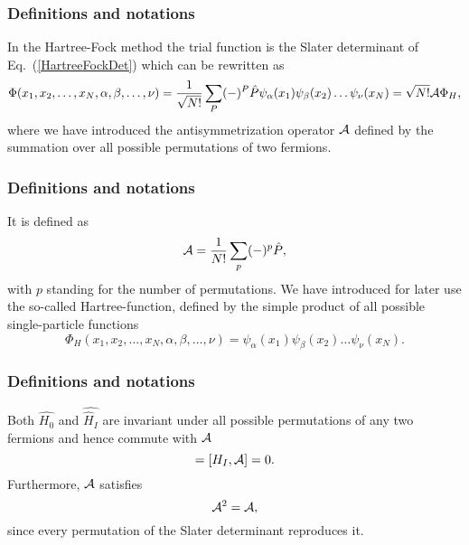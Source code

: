 \documentclass[compress]{beamer}
\begin{document}
\frame
{
  \frametitle{Definitions and notations}
\begin{small}
{\scriptsize
In the Hartree-Fock method the trial function is the Slater
determinant of Eq.~(\ref{HartreeFockDet}) which can be rewritten as 
\begin{equation}
  \Phi(x_1,x_2,\dots,x_N,\alpha,\beta,\dots,\nu) = \frac{1}{\sqrt{N!}}\sum_{P} (-)^P\hat{P}\psi_{\alpha}(x_1)
    \psi_{\beta}(x_2)\dots\psi_{\nu}(x_N)=\sqrt{N!}{\cal A}\Phi_H,
\label{HartreeFockPermutation}
\end{equation}
where we have introduced the antisymmetrization operator ${\cal A}$ defined by the 
summation over all possible permutations of two fermions.
}
\end{small}
}

\frame
{
  \frametitle{Definitions and notations}
\begin{small}
{\scriptsize
It is defined as
\begin{equation}
  {\cal A} = \frac{1}{N!}\sum_{p} (-)^p\hat{P},
\label{antiSymmetryOperator}
\end{equation}
with $p$ standing for the number of permutations. We have introduced for later use the so-called
Hartree-function, defined by the simple product of all possible single-particle functions
\begin{equation*}
  \Phi_H(x_1,x_2,\dots,x_N,\alpha,\beta,\dots,\nu) =
  \psi_{\alpha}(x_1)
    \psi_{\beta}(x_2)\dots\psi_{\nu}(x_N).
\end{equation*}

}
\end{small}
}

\frame
{
  \frametitle{Definitions and notations}
\begin{small}
{\scriptsize
Both $\hat{H_0}$ and $\hat{\hat{H}_I}$ are invariant under all possible permutations of any two fermions
and hence commute with ${\cal A}$
\begin{equation}
  [H_0,{\cal A}] = [H_I,{\cal A}] = 0.
  \label{cummutionAntiSym}
\end{equation}
Furthermore, ${\cal A}$ satisfies
\begin{equation}
  {\cal A}^2 = {\cal A},
  \label{AntiSymSquared}
\end{equation}
since every permutation of the Slater
determinant reproduces it. 
}
\end{small}
}
\end{document}
